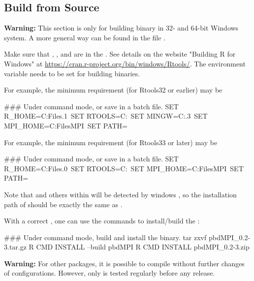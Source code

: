 \subsection[Build from Source]{Build from Source}
\label{sec:building_from_source}

{\color{red} \bf Warning:} This section is only for building binary in
32- and 64-bit Windows system. A more general way can be found in the file
.

Make sure that , , and  are in
the .
See details on the website "Building R for Windows" at
\url{https://cran.r-project.org/bin/windows/Rtools/}.
The environment variable 
needs to be set for building binaries.

For example, the minimum requirement (for Rtools32 or earlier) may be
\begin{Command}
### Under command mode, or save in a batch file.
SET R_HOME=C:\Program Files\R{}.1\
SET RTOOLS=C:\Rtools\bin\
SET MINGW=C:\Rtools{}.3\bin\
SET MPI_HOME=C:\Program Files\Miscrosoft MPI\
SET PATH=%
\end{Command}

For example, the minimum requirement (for Rtools33 or later) may be
\begin{Command}
### Under command mode, or save in a batch file.
SET R_HOME=C:\Program Files\R{}.0\
SET RTOOLS=C:\Rtools\bin\
SET MPI_HOME=C:\Program Files\Miscrosoft MPI\
SET PATH=%
\end{Command}
Note that  and others within  will be detected by
windows \proglang{R}, so the installation path of  should be
exactly the same as \code{C:/Rtools}.

With a correct \code{PATH}, one can use the  commands
to install/build the \pkg{pbdMPI}:
\begin{Command}
### Under command mode, build and install the binary.
tar zxvf pbdMPI_0.2-3.tar.gz
R CMD INSTALL --build pbdMPI
R CMD INSTALL pbdMPI_0.2-3.zip
\end{Command}

{\color{red} \bf Warning:} For other  packages, it is possible
to compile without further changes of configurations. However, only
\pkg{pbdMPI} is tested regularly before any release.

